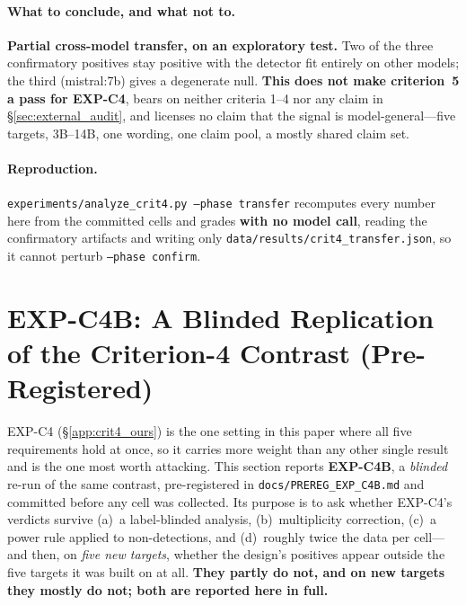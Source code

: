 \paragraph{What to conclude, and what not to.} \textbf{Partial cross-model transfer, on an exploratory test.} Two of the three confirmatory positives stay positive with the detector fit entirely on other models; the third (mistral:7b) gives a degenerate null. \textbf{This does not make criterion~5 a pass for EXP-C4}, bears on neither criteria 1--4 nor any claim in §\ref{sec:external_audit}, and licenses no claim that the signal is model-general---five targets, 3B--14B, one wording, one claim pool, a mostly shared claim set.

\paragraph{Reproduction.} \texttt{experiments/analyze\_crit4.py --phase transfer} recomputes every number here from the committed cells and grades \textbf{with no model call}, reading the confirmatory artifacts and writing only \texttt{data/results/crit4\_transfer.json}, so it cannot perturb \texttt{--phase confirm}.

\section{EXP-C4B: A Blinded Replication of the Criterion-4 Contrast (Pre-Registered)}
\label{app:crit4b}

EXP-C4 (§\ref{app:crit4_ours}) is the one setting in this paper where all five requirements hold at once, so it carries more weight than any other single result and is the one most worth attacking. This section reports \textbf{EXP-C4B}, a \emph{blinded} re-run of the same contrast, pre-registered in \texttt{docs/PREREG\_EXP\_C4B.md} and committed before any cell was collected. Its purpose is to ask whether EXP-C4's verdicts survive (a)~a label-blinded analysis, (b)~multiplicity correction, (c)~a power rule applied to non-detections, and (d)~roughly twice the data per cell---and then, on \emph{five new targets}, whether the design's positives appear outside the five targets it was built on at all. \textbf{They partly do not, and on new targets they mostly do not; both are reported here in full.}

